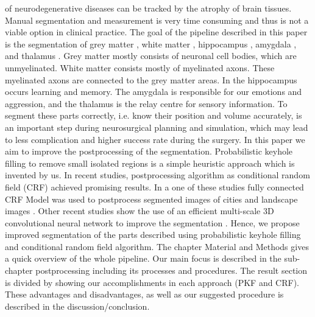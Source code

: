 \documentclass[journal]{IEEEtran}
\begin{document}
 of neurodegenerative diseases can be tracked by the atrophy of brain tissues.
Manual segmentation and measurement is very time consuming and thus is not a viable option in clinical practice. 
The goal of the pipeline described in this paper is the segmentation of grey matter , white matter , hippocampus , amygdala , and thalamus . 
Grey matter mostly consists of neuronal cell bodies, which are unmyelinated. White matter consists mostly of myelinated axons. These myelinated axons are connected to the grey matter areas. In the hippocampus occurs learning and memory. The amygdala is responsible for our emotions and aggression, and the thalamus is the relay centre for sensory information. To segment these parts correctly, i.e. know their position and volume accurately, is an important step during neurosurgical planning and simulation, which may lead to less complication and higher success rate during the surgery. 
In this paper we aim to improve the postprocessing of the segmentation. Probabilistic keyhole filling to remove small isolated regions is a simple heuristic approach which is invented by us. In recent studies, postprocessing algorithm as conditional random field (CRF) achieved promising results. In a one of these studies fully connected CRF Model was used to postprocess segmented images of cities and landscape images \cite{Liu2018}. Other recent studies show the use of an efficient multi-scale 3D convolutional neural network to improve the segmentation \cite{Kamnitsas2017}.  Hence, we propose improved segmentation of the parts described using probabilistic keyhole filling and conditional random field algorithm. The chapter Material and Methods gives a quick overview of the whole pipeline. Our main focus is described in the sub-chapter postprocessing including its processes and procedures. The result section is divided by showing our accomplishments in each approach (PKF and CRF). These advantages and disadvantages, as well as our suggested procedure is described in the discussion/conclusion.
\end{document}
